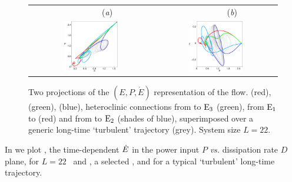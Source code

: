 \begin{figure}[t]
\begin{center}
 \begin{tabular}{cc}
		~~~~~~~~(\textit{a})						&	~~~~~~~~(\textit{b}) \\
	\includegraphics[width=0.46\textwidth]{figs/connEP.eps}		& \includegraphics[width=0.46\textwidth]{figs/connPEdot.eps}
 \end{tabular}
\end{center}
\caption{
Two projections of the $(E,P,\dot{E})$ representation of the flow.
 (red),  (green),  (blue),
heteroclinic connections from  to $\mathrm{E}_{3}$ (green),
from $\mathrm{E}_{1}$ to  (red)
and from  to $\mathrm{E}_{2}$ (shades of blue), superimposed over
a generic long-time `turbulent' trajectory (grey).
System size $L=22$.
        }
\label{f:drivedragConn}
\end{figure}

In  we plot , the time-dependent
$\dot{E}$ in the power input $P$ {\em vs.}
dissipation rate $D$ plane, for $L=22$ \eqva\ and \reqva,
a selected \rpo, and for a typical `turbulent' long-time
trajectory.


